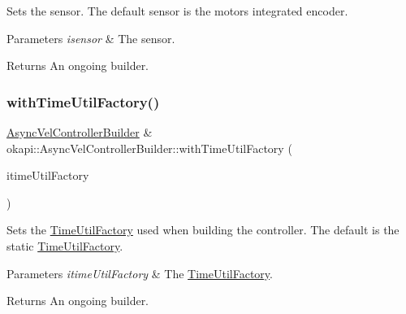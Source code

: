 Sets the sensor. The default sensor is the motor\textquotesingle{}s integrated encoder.


\begin{DoxyParams}{Parameters}
{\em isensor} & The sensor. \\
\hline
\end{DoxyParams}
\begin{DoxyReturn}{Returns}
An ongoing builder. 
\end{DoxyReturn}
\mbox{\label{classokapi_1_1AsyncVelControllerBuilder_a4996a83333f1affdd0b77054ece7d07d}} 
\subsubsection{\texorpdfstring{withTimeUtilFactory()}{withTimeUtilFactory()}}
{\footnotesize\ttfamily \mbox{\hyperlink{classokapi_1_1AsyncVelControllerBuilder}{Async\+Vel\+Controller\+Builder}} \& okapi\+::\+Async\+Vel\+Controller\+Builder\+::with\+Time\+Util\+Factory (\begin{DoxyParamCaption}\item[{const \mbox{\hyperlink{classokapi_1_1TimeUtilFactory}{Time\+Util\+Factory}} \&}]{itime\+Util\+Factory }\end{DoxyParamCaption})}

Sets the \mbox{\hyperlink{classokapi_1_1TimeUtilFactory}{Time\+Util\+Factory}} used when building the controller. The default is the static \mbox{\hyperlink{classokapi_1_1TimeUtilFactory}{Time\+Util\+Factory}}.


\begin{DoxyParams}{Parameters}
{\em itime\+Util\+Factory} & The \mbox{\hyperlink{classokapi_1_1TimeUtilFactory}{Time\+Util\+Factory}}. \\
\hline
\end{DoxyParams}
\begin{DoxyReturn}{Returns}
An ongoing builder. 
\end{DoxyReturn}
\mbox{\label{classokapi_1_1AsyncVelControllerBuilder_aa385c0ae6f8464955a950465b7cff1b6}} 
